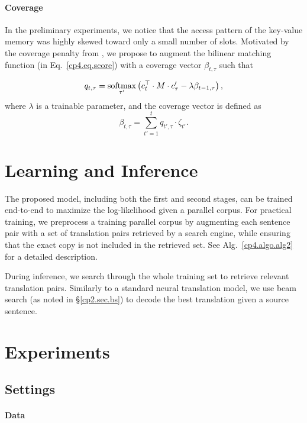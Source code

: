 \paragraph{Coverage}

In the preliminary experiments, we notice that the access pattern of the key-value memory was highly skewed toward only a small number of slots. Motivated by the coverage penalty from \citep{tu2016modeling}, we propose to augment the bilinear matching function (in Eq.~\eqref{cp4.eq.score}) with a coverage vector $\beta_{t,\tau}$ such that

\begin{align}
\label{cp4.eq.match}
     q_{t, \tau}  = \mathop{\operatorname{\text{softmax}}}\limits_{\tau'}\left(c_t^\top \cdot M \cdot c'_\tau - \lambda \beta_{t-1, \tau}\right),
\end{align}
where  $\lambda$ is a trainable parameter, and the coverage vector is defined as 
\begin{equation}
	 \beta_{t, \tau}= \sum_{t'=1}^t q_{t', \tau}\cdot\zeta_{t'}.
\end{equation}

\section{Learning and Inference}
The proposed model, including both the first and second stages, can be trained end-to-end to maximize the log-likelihood given a parallel corpus. For practical training, we preprocess a training parallel corpus by augmenting each sentence pair with a set of translation pairs retrieved by a search engine, while ensuring that the exact copy is not included in the retrieved set. See Alg.~\ref{cp4.algo.alg2} for a detailed description. 

During inference, we search through the whole training set to retrieve relevant translation pairs. Similarly to a standard neural translation model, we use beam search (as noted in \S\ref{cp2.sec.bs})  to decode the best translation given a source sentence. 


\section{Experiments}
\subsection{Settings}
\paragraph{Data}


